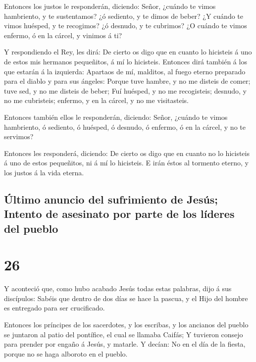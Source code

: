  Entonces los justos le responderán, diciendo: Señor,
¿cuándo te vimos hambriento, y te sustentamos? ¿ó sediento, y te dimos
de beber?  ¿Y cuándo te vimos huésped, y te recogimos? ¿ó
desnudo, y te cubrimos?  ¿O cuándo te vimos enfermo, ó en
la cárcel, y vinimos á ti?

 Y respondiendo el Rey, les dirá: De cierto os digo que en
cuanto lo hicisteis á uno de estos mis hermanos pequeñitos, á mí lo
hicisteis.  Entonces dirá también á los que estarán á la
izquierda: Apartaos de mí, malditos, al fuego eterno preparado para el
diablo y para sus ángeles:  Porque tuve hambre, y no me
disteis de comer; tuve sed, y no me disteis de beber;  Fuí
huésped, y no me recogisteis; desnudo, y no me cubristeis; enfermo, y en
la cárcel, y no me visitasteis.

 Entonces también ellos le responderán, diciendo: Señor,
¿cuándo te vimos hambriento, ó sediento, ó huésped, ó desnudo, ó
enfermo, ó en la cárcel, y no te servimos?

 Entonces les responderá, diciendo: De cierto os digo que
en cuanto no lo hicisteis á uno de estos pequeñitos, ni á mí lo
hicisteis.  E irán éstos al tormento eterno, y los justos á
la vida eterna.

\hypertarget{uxfaltimo-anuncio-del-sufrimiento-de-jesuxfas-intento-de-asesinato-por-parte-de-los-luxedderes-del-pueblo}{%
\subsection{Último anuncio del sufrimiento de Jesús; Intento de
asesinato por parte de los líderes del
pueblo}\label{uxfaltimo-anuncio-del-sufrimiento-de-jesuxfas-intento-de-asesinato-por-parte-de-los-luxedderes-del-pueblo}}

\hypertarget{section-25}{%
\section{26}\label{section-25}}

 Y aconteció que, como hubo acabado Jesús todas estas
palabras, dijo á sus discípulos:  Sabéis que dentro de dos
días se hace la pascua, y el Hijo del hombre es entregado para ser
crucificado.

 Entonces los príncipes de los sacerdotes, y los escribas, y
los ancianos del pueblo se juntaron al patio del pontífice, el cual se
llamaba Caifás;  Y tuvieron consejo para prender por engaño
á Jesús, y matarle.  Y decían: No en el día de la fiesta,
porque no se haga alboroto en el pueblo.

